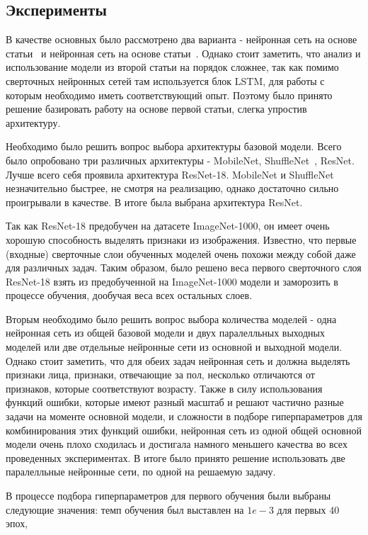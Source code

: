 \subsection{Эксперименты}\label{subsec:эксперименты}
В качестве основных было рассмотрено два варианта - нейронная сеть на основе статьи~\cite{ror} и нейронная сеть на основе статьи~\cite{lstm}.
Однако стоит заметить, что анализ и использование модели из второй статьи на порядок сложнее, так как помимо сверточных нейронных сетей там используется блок LSTM,
для работы с которым необходимо иметь соответствующий опыт.
Поэтому было принято решение базировать работу на основе первой статьи, слегка упростив архитектуру.
\par Необходимо было решить вопрос выбора архитектуры базовой модели.
Всего было опробовано три различных архитектуры - MobileNet, ShuffleNet~\cite{shuffle}, ResNet.
Лучше всего себя проявила архитектура ResNet-18.
MobileNet и ShuffleNet незначительно быстрее, не смотря на реализацию, однако достаточно сильно проигрывали в качестве.
В итоге была выбрана архитектура ResNet.
\par Так как ResNet-18 предобучен на датасете ImageNet-1000, он имеет очень хорошую способность выделять признаки из изображения.
Известно, что первые (входные) сверточные слои обученных моделей очень похожи между собой даже для различных задач.
Таким образом, было решено веса первого сверточного слоя ResNet-18 взять из предобученной на ImageNet-1000 модели и заморозить в процессе обучения,
дообучая веса всех остальных слоев.
\par Вторым необходимо было решить вопрос выбора количества моделей - одна нейронная сеть из общей базовой модели и двух паралелльных выходных моделей
или две отдельные нейронные сети из основной и выходной модели.
Однако стоит заметить, что для обеих задач нейронная сеть и должна выделять признаки лица, признаки,
отвечающие за пол, несколько отличаются от признаков, которые соответствуют возрасту.
Также в силу использования функций ошибки,
которые имеют разный масштаб и решают частично разные задачи на моменте основной модели,
и сложности в подборе гиперпараметров для комбинирования этих функций ошибки,
нейронная сеть из одной общей основной модели очень плохо сходилась и достигала намного меньшего качества во всех проведенных экспериментах.
В итоге было принято решение использовать две паралелльные нейронные сети, по одной на решаемую задачу.
\par В процессе подбора гиперпараметров для первого обучения были выбраны следующие значения: темп обучения был выставлен на $1e-3$ для первых 40 эпох,
